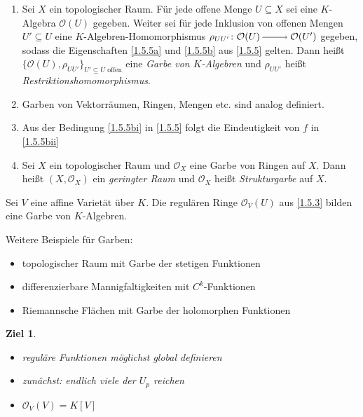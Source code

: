 \documentclass[a4paper,12pt]{scrbook}
\newtheorem{ziel}{Ziel}
\def\O{\mathcal{O}}
\newcommand{\ra}{\raisebox{-1pt}{\tikz{\draw[thin,shorten >=3pt, ->] (0,0) node{\hspace*{-2pt}} -- node{} (1,0);}}\penalty1000\relax}
\begin{document}
\begin{dfn}\label{1.5.6}
  \begin{enumerate}
  \item Sei $X$ ein topologischer Raum. Für jede offene Menge $U\subseteq X$ sei eine $K$-Algebra $\O(U)$ gegeben. Weiter sei
    für jede Inklusion von offenen Mengen $U'\subseteq U$ eine $K$-Algebren-Homomorphismus $\rho_{UU'}\colon\O(U)\ra\O(U')$
    gegeben, sodass die Eigenschaften \ref{1.5.5a} und \ref{1.5.5b} aus \cref{1.5.5} gelten. Dann heißt
    $\{\O(U),\rho_{UU'}\}_{U'\subseteq U\text{ offen}}$ eine \emph{Garbe von $K$-Algebren} und $\rho_{UU'}$ heißt
    \emph{Restriktionshomomorphismus}.
  \item Garben von Vektorräumen, Ringen, Mengen etc. sind analog definiert.
  \item Aus der Bedingung \ref{1.5.5bi} in \cref{1.5.5} folgt die Eindeutigkeit von $f$ in \ref{1.5.5bii}
  \item Sei $X$ ein topologischer Raum und $\O_X$ eine Garbe von Ringen auf $X$. Dann heißt $(X,\O_X)$ ein \emph{geringter Raum}
    und $\O_X$ heißt \emph{Strukturgarbe} auf $X$.
  \end{enumerate}
\end{dfn}

\begin{bem}\label{1.5.7}
  Sei $V$ eine affine Varietät über $K$. Die regulären Ringe $\O_V(U)$ aus \cref{1.5.3} bilden eine Garbe von $K$-Algebren.
\end{bem}

\begin{bsp}\label{1.5.8}
  Weitere Beispiele für Garben:
  \begin{itemize}
  \item topologischer Raum mit Garbe der stetigen Funktionen
  \item differenzierbare Mannigfaltigkeiten mit $C^k$-Funktionen
  \item Riemannsche Flächen mit Garbe der holomorphen Funktionen
  \end{itemize}
\end{bsp}

\begin{ziel}
  \begin{itemize}
  \item reguläre Funktionen möglichst global definieren
  \item zunächst: endlich viele der $U_p$ reichen
  \item $\O_V(V)=K[V]$
  \end{itemize}
\end{ziel}
\end{document}
